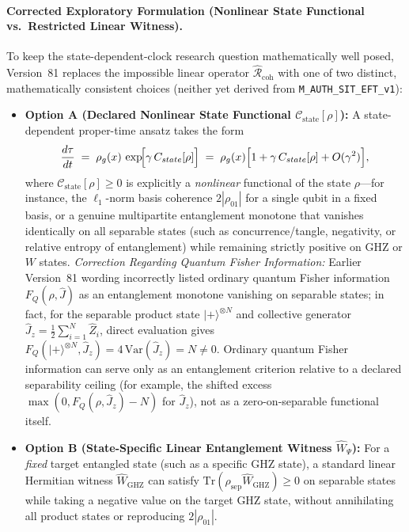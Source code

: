 \paragraph{Corrected Exploratory Formulation (Nonlinear State Functional vs.\ Restricted Linear Witness).}
To keep the state-dependent-clock research question mathematically well posed, Version~81 replaces the impossible linear operator $\hat{\mathcal{R}}_{\mathrm{coh}}$ with one of two distinct, mathematically consistent choices (neither yet derived from \texttt{M\_AUTH\_SIT\_EFT\_v1}):
\begin{itemize}
  \item \textbf{Option A (Declared Nonlinear State Functional $\mathcal{C}_{\mathrm{state}}[\rho]$):} A state-dependent proper-time ansatz takes the form
  \begin{equation}
  \frac{d\tau}{dt} \;=\; \rho_g(x)\,\exp\!\Bigl[\gamma\,\mathcal{C}_{\mathrm{state}}[\rho]\Bigr]
  \;=\; \rho_g(x)\Bigl[1 + \gamma\,\mathcal{C}_{\mathrm{state}}[\rho] + \mathcal{O}(\gamma^2)\Bigr],
  \label{eq:SIT3-master}
  \end{equation}
  where $\mathcal{C}_{\mathrm{state}}[\rho] \ge 0$ is explicitly a \emph{nonlinear} functional of the state $\rho$---for instance, the $\ell_1$-norm basis coherence $2|\rho_{01}|$ for a single qubit in a fixed basis, or a genuine multipartite entanglement monotone that vanishes identically on all separable states (such as concurrence/tangle, negativity, or relative entropy of entanglement) while remaining strictly positive on GHZ or $W$ states. \emph{Correction Regarding Quantum Fisher Information:} Earlier Version~81 wording incorrectly listed ordinary quantum Fisher information $F_Q(\rho, \hat{J})$ as an entanglement monotone vanishing on separable states; in fact, for the separable product state $|+\rangle^{\otimes N}$ and collective generator $\hat{J}_z = \frac{1}{2}\sum_{i=1}^N \hat{Z}_i$, direct evaluation gives $F_Q(|+\rangle^{\otimes N}, \hat{J}_z) = 4\,\mathrm{Var}(\hat{J}_z) = N \ne 0$. Ordinary quantum Fisher information can serve only as an entanglement criterion relative to a declared separability ceiling (for example, the shifted excess $\max(0, F_Q(\rho, \hat{J}_z) - N)$ for $\hat{J}_z$), not as a zero-on-separable functional itself.
  \item \textbf{Option B (State-Specific Linear Entanglement Witness $\hat{W}_{\Psi}$):} For a \emph{fixed} target entangled state (such as a specific GHZ state), a standard linear Hermitian witness $\hat{W}_{\mathrm{GHZ}}$ can satisfy $\mathrm{Tr}(\rho_{\mathrm{sep}}\hat{W}_{\mathrm{GHZ}}) \ge 0$ on separable states while taking a negative value on the target GHZ state, without annihilating all product states or reproducing $2|\rho_{01}|$.
\end{itemize}

